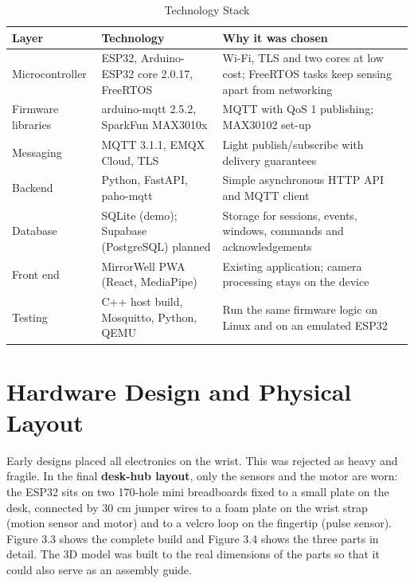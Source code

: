 \documentclass[12pt,letterpaper,oneside]{report}
\begin{document}
\begin{table}[H]
\centering\small{}
\caption{Technology Stack}\label{tab:technology-stack}
\begin{tabular}{|>{\raggedright\arraybackslash}p{}|>{\raggedright\arraybackslash}p{}|>{\raggedright\arraybackslash}p{}|}
\hline
\rowcolor{headgray}\textbf{Layer} & \textbf{Technology} & \textbf{Why it was chosen} \\ \hline
Microcontroller & ESP32, Arduino-ESP32 core 2.0.17, FreeRTOS & Wi-Fi, TLS and two cores at low cost; FreeRTOS tasks keep sensing apart from networking \\ \hline
Firmware libraries & arduino-mqtt 2.5.2, SparkFun MAX3010x & MQTT with QoS 1 publishing; MAX30102 set-up \\ \hline
Messaging & MQTT 3.1.1, EMQX Cloud, TLS & Light publish/subscribe with delivery guarantees \\ \hline
Backend & Python, FastAPI, paho-mqtt & Simple asynchronous HTTP API and MQTT client \\ \hline
Database & SQLite (demo); Supabase (PostgreSQL) planned & Storage for sessions, events, windows, commands and acknowledgements \\ \hline
Front end & MirrorWell PWA (React, MediaPipe) & Existing application; camera processing stays on the device \\ \hline
Testing & C++ host build, Mosquitto, Python, QEMU & Run the same firmware logic on Linux and on an emulated ESP32 \\ \hline
\end{tabular}
\end{table}

\section{Hardware Design and Physical Layout}\label{sec:3.4}

Early designs placed all electronics on the wrist. This was rejected as heavy and fragile. In the final \textbf{desk-hub layout}, only the sensors and the motor are worn: the ESP32 sits on two 170-hole mini breadboards fixed to a small plate on the desk, connected by 30 cm jumper wires to a foam plate on the wrist strap (motion sensor and motor) and to a velcro loop on the fingertip (pulse sensor). Figure 3.3 shows the complete build and Figure 3.4 shows the three parts in detail. The 3D model was built to the real dimensions of the parts so that it could also serve as an assembly guide.
\end{document}
